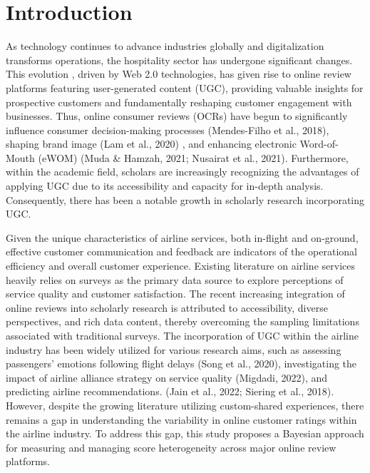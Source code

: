 \documentclass[
]{agujournal2019}
\begin{document}
\section{Introduction}\label{introduction}

As technology continues to advance industries globally and
digitalization transforms operations, the hospitality sector has
undergone significant changes. This evolution , driven by Web 2.0
technologies, has given rise to online review platforms featuring
user-generated content (UGC), providing valuable insights for
prospective customers and fundamentally reshaping customer engagement
with businesses. Thus, online consumer reviews (OCRs) have begun to
significantly influence consumer decision-making processes (Mendes-Filho
et al., 2018), shaping brand image (Lam et al., 2020) , and enhancing
electronic Word-of-Mouth (eWOM) (Muda \& Hamzah, 2021; Nusairat et al.,
2021). Furthermore, within the academic field, scholars are increasingly
recognizing the advantages of applying UGC due to its accessibility and
capacity for in-depth analysis. Consequently, there has been a notable
growth in scholarly research incorporating UGC.

Given the unique characteristics of airline services, both in-flight and
on-ground, effective customer communication and feedback are indicators
of the operational efficiency and overall customer experience. Existing
literature on airline services heavily relies on surveys as the primary
data source to explore perceptions of service quality and customer
satisfaction. The recent increasing integration of online reviews into
scholarly research is attributed to accessibility, diverse perspectives,
and rich data content, thereby overcoming the sampling limitations
associated with traditional surveys. The incorporation of UGC within the
airline industry has been widely utilized for various research aims,
such as assessing passengers' emotions following flight delays (Song et
al., 2020), investigating the impact of airline alliance strategy on
service quality (Migdadi, 2022), and predicting airline recommendations.
(Jain et al., 2022; Siering et al., 2018). However, despite the growing
literature utilizing custom-shared experiences, there remains a gap in
understanding the variability in online customer ratings within the
airline industry. To address this gap, this study proposes a Bayesian
approach for measuring and managing score heterogeneity across major
online review platforms.
\end{document}
